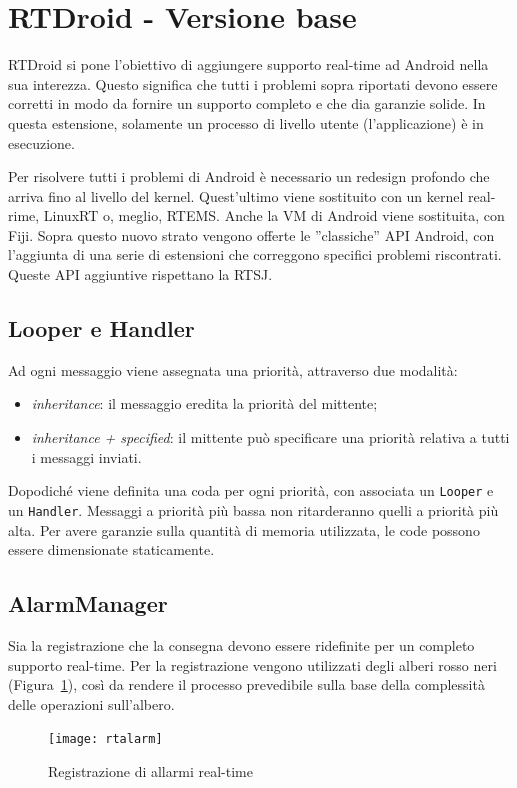 \section{RTDroid - Versione base}
RTDroid si pone l'obiettivo di aggiungere supporto real-time ad Android nella sua interezza. Questo significa che tutti i problemi sopra riportati devono essere corretti in modo da fornire un supporto completo e che dia garanzie solide. In questa estensione, solamente un processo di livello utente (l'applicazione) è in esecuzione. 

Per risolvere tutti i problemi di Android è necessario un redesign profondo che arriva fino al livello del kernel. Quest'ultimo viene sostituito con un kernel real-rime, LinuxRT o, meglio, RTEMS. Anche la VM di Android viene sostituita, con Fiji. Sopra questo nuovo strato vengono offerte le ''classiche'' API Android, con l'aggiunta di una serie di estensioni che correggono specifici problemi riscontrati. Queste API aggiuntive rispettano la RTSJ. 

\subsection{Looper e Handler}
Ad ogni messaggio viene assegnata una priorità, attraverso due modalità:
\begin{itemize}
	\item\textit{inheritance}: il messaggio eredita la priorità del mittente;
	\item\textit{inheritance + specified}: il mittente può specificare una priorità relativa a tutti i messaggi inviati.
\end{itemize}
Dopodiché viene definita una coda per ogni priorità, con associata un \texttt{Looper} e un \texttt{Handler}. Messaggi a priorità più bassa non ritarderanno quelli a priorità più alta. Per avere garanzie sulla quantità di memoria utilizzata, le code possono essere dimensionate staticamente.

\subsection{AlarmManager}
Sia la registrazione che la consegna devono essere ridefinite per un completo supporto real-time. Per la registrazione vengono utilizzati degli alberi rosso neri (Figura~\ref{fig:rtalarm}), così da rendere il processo prevedibile sulla base della complessità delle operazioni sull'albero. 
\begin{figure}[h]
	\centering
	\texttt{[image: rtalarm]}
	\caption{Registrazione di allarmi real-time}
	\label{fig:rtalarm}
\end{figure}

